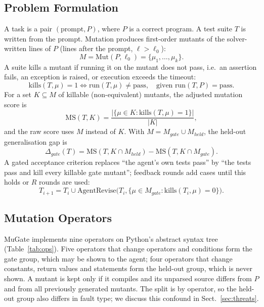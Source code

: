 \documentclass[runningheads]{llncs}
\newcommand{\gate}{\mathit{gate}}
\newcommand{\held}{\mathit{held}}
\newcommand{\MS}{\mathrm{MS}}
\begin{document}
\subsection{Problem Formulation}
A task is a pair $(\text{prompt}, P)$, where $P$ is a correct program. A test suite $T$ is written from the prompt. Mutation produces first-order mutants of the solver-written lines of $P$ (lines after the prompt, $\ell > \ell_0$):
\begin{equation}
M = \mathrm{Mut}(P,\ell_0) = \{\mu_1,\dots,\mu_k\}.
\end{equation}
A suite kills a mutant if running it on the mutant does not pass, i.e.\ an assertion fails, an exception is raised, or execution exceeds the timeout:
\begin{equation}
\mathrm{kills}(T,\mu) = 1 \iff \mathrm{run}(T,\mu) \neq \text{pass}, \quad\text{given } \mathrm{run}(T,P) = \text{pass}.
\end{equation}
For a set $K \subseteq M$ of killable (non-equivalent) mutants, the adjusted mutation score is
\begin{equation}\label{eq:ms}
\MS(T,K) = \frac{|\{\mu \in K : \mathrm{kills}(T,\mu)=1\}|}{|K|},
\end{equation}
and the raw score uses $M$ instead of $K$. With $M = M_\gate \cup M_\held$, the held-out generalisation gap is
\begin{equation}\label{eq:delta}
\Delta_\gate(T) = \MS(T, K\cap M_\held) - \MS(T, K\cap M_\gate).
\end{equation}
A gated acceptance criterion replaces ``the agent's own tests pass'' by ``the tests pass and kill every killable gate mutant''; feedback rounds add cases until this holds or $R$ rounds are used:
\begin{equation}
T_{i+1} = T_i \cup \mathrm{AgentRevise}\big(T_i, \{\mu\in M_\gate : \mathrm{kills}(T_i,\mu)=0\}\big).
\end{equation}

\subsection{Mutation Operators}
MuGate implements nine operators on Python's abstract syntax tree (Table~\ref{tab:ops}). Five operators that change operators and conditions form the gate group, which may be shown to the agent; four operators that change constants, return values and statements form the held-out group, which is never shown. A mutant is kept only if it compiles and its unparsed source differs from $P$ and from all previously generated mutants. The split is by operator, so the held-out group also differs in fault type; we discuss this confound in Sect.~\ref{sec:threats}.
\end{document}
